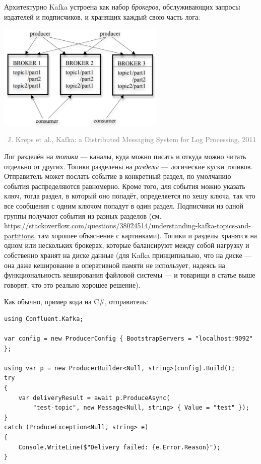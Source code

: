 \documentclass[a5paper]{article}
\newcommand{\attribution}[1] {
    \vspace{-5mm}\begin{flushright}\begin{scriptsize}\textcolor{gray}{\textcopyright\, #1}\end{scriptsize}\end{flushright}
}
\begin{document}
Архитектурно Kafka устроена как набор \emph{брокеров}, обслуживающих запросы издателей и подписчиков, и хранящих каждый свою часть лога:

\begin{center}
    \includegraphics[width=0.6\textwidth]{kafkaArchitecture.png}
    \attribution{J. Kreps et al., Kafka: a Distributed Messaging System for Log Processing, 2011}
\end{center}

Лог разделён на \emph{топики} --- каналы, куда можно писать и откуда можно читать отдельно от других. Топики разделены на \emph{разделы} --- логические куски топиков. Отправитель может послать событие в конкретный раздел, по умолчанию события распределяются равномерно. Кроме того, для события можно указать ключ, тогда раздел, в который оно попадёт, определяется по хешу ключа, так что все сообщения с одним ключом попадут в один раздел. Подписчики из одной группы получают события из разных разделов (см. \url{https://stackoverflow.com/questions/38024514/understanding-kafka-topics-and-partitions}, там хорошее объяснение с картинками). Топики и разделы хранятся на одном или нескольких брокерах, которые балансируют между собой нагрузку и собственно хранят на диске данные (для Kafka принципиально, что на диске --- она даже кеширование в оперативной памяти не использует, надеясь на функциональность кеширования файловой системы --- и товарищи в статье выше говорят, что это реально хорошее решение).

Как обычно, пример кода на C\#, отправитель:

\begin{verbatim}
using Confluent.Kafka;

var config = new ProducerConfig { BootstrapServers = "localhost:9092" };

using var p = new ProducerBuilder<Null, string>(config).Build();
try
{
    var deliveryResult = await p.ProduceAsync(
        "test-topic", new Message<Null, string> { Value = "test" });
}
catch (ProduceException<Null, string> e)
{
    Console.WriteLine($"Delivery failed: {e.Error.Reason}");
}
\end{verbatim}
\end{document}
